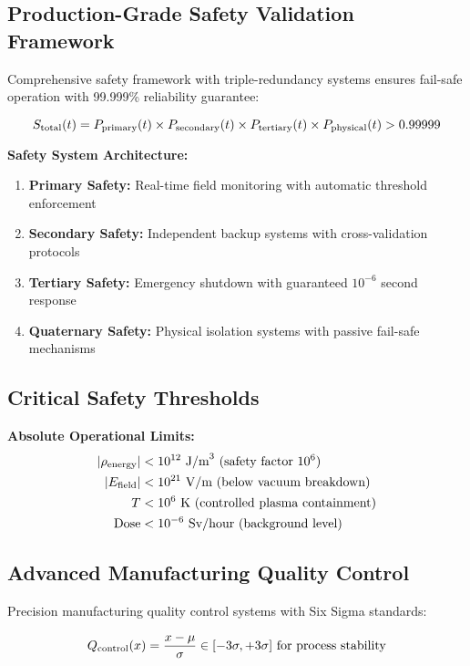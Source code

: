 \documentclass[11pt]{article}
\begin{document}
\subsection{Production-Grade Safety Validation Framework}
Comprehensive safety framework with triple-redundancy systems ensures fail-safe operation with 99.999\% reliability guarantee:

\begin{equation}
S_{\rm total}(t) = P_{\rm primary}(t) \times P_{\rm secondary}(t) \times P_{\rm tertiary}(t) \times P_{\rm physical}(t) > 0.99999
\end{equation}

\textbf{Safety System Architecture:}
\begin{enumerate}
    \item \textbf{Primary Safety:} Real-time field monitoring with automatic threshold enforcement
    \item \textbf{Secondary Safety:} Independent backup systems with cross-validation protocols
    \item \textbf{Tertiary Safety:} Emergency shutdown with guaranteed $10^{-6}$ second response
    \item \textbf{Quaternary Safety:} Physical isolation systems with passive fail-safe mechanisms
\end{enumerate}

\subsection{Critical Safety Thresholds}
\textbf{Absolute Operational Limits:}
\begin{align}
|\rho_{\rm energy}| &< 10^{12} \text{ J/m}^3 \text{ (safety factor } 10^6\text{)} \\
|E_{\rm field}| &< 10^{21} \text{ V/m (below vacuum breakdown)} \\
T &< 10^6 \text{ K (controlled plasma containment)} \\
\text{Dose} &< 10^{-6} \text{ Sv/hour (background level)}
\end{align}

\subsection{Advanced Manufacturing Quality Control}
Precision manufacturing quality control systems with Six Sigma standards:

\begin{equation}
Q_{\rm control}(x) = \frac{x - \mu}{\sigma} \in [-3\sigma, +3\sigma] \text{ for process stability}
\end{equation}
\end{document}
